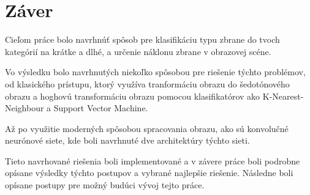 
\chapter{Záver}

Cieľom práce bolo navrhnúť spôsob pre klasifikáciu typu zbrane do tvoch kategórií na krátke a dlhé, a
    určenie náklonu zbrane v obrazovej scéne.

Vo výsledku bolo navrhnutých niekoľko spôsobou pre riešenie týchto problémov, od klasického prístupu,
    ktorý využíva tranformáciu obrazu do šedotónového obrazu a hoghovú transformáciu obrazu pomocou
    klasifikatórov ako K-Nearest-Neighbour a Support Vector Machine.

Až po využitie moderných spôsobou spracovania obrazu, ako sú konvolučné neurónové siete, kde boli navrhnuté
    dve architektúry týchto sieti.

Tieto navrhované riešenia boli implementované a v závere práce boli podrobne opísane výsledky týchto postupov a
    vybrané najlepšie riešenie.
Následne boli opísane postupy pre možný budúci vývoj tejto práce.
